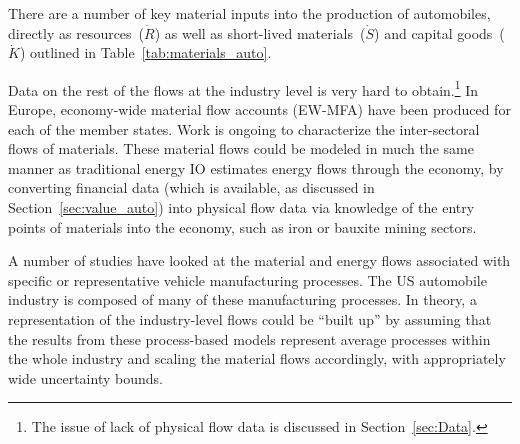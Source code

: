 There are a number of key material inputs into the
production of automobiles, directly as 
resources~($\dot{R}$) as well as short-lived 
materials~($\dot{S}$) and capital goods~($\dot{K}$)
outlined in Table~\ref{tab:materials_auto}. 



Data on the rest of the flows at the industry level
is very hard to obtain.\footnote{The issue of 
lack of physical flow data is discussed in 
Section~\ref{sec:Data}.}
In Europe,
economy-wide material flow accounts (EW-MFA)
have been produced for each of the member 
states.\cite{EUROSTAT2011} 
Work is ongoing to characterize the inter-sectoral
flows of materials.\cite{ConAccount1998}
These material flows could be modeled in much the same
manner as traditional energy IO estimates energy flows
through the economy,
by converting financial data 
(which is available, as discussed in 
Section~\ref{sec:value_auto}) into physical flow data
via knowledge of the entry points of materials into the economy,
such as iron or bauxite mining sectors.

A number of studies have looked at 
the material and energy flows 
associated with specific or representative vehicle manufacturing 
processes.\cite{Sullivan1998, MacLean1998,Schweimer2000,
McCleese2002,MacLean2003, Burnham2006,Sullivan2010, Hawkins2012}
The US automobile industry is composed
of many of these manufacturing processes.
In theory,
a representation of the industry-level flows
could be ``built up'' by assuming that the results from
these process-based models represent average
processes within the whole industry and 
scaling the material flows accordingly,
with appropriately wide uncertainty bounds.




